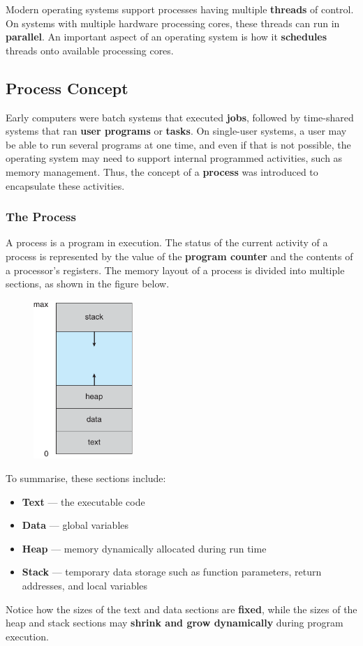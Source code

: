 \documentclass{article}
\begin{document}
Modern operating systems support processes having multiple
\textbf{threads} of control. On systems with multiple hardware
processing cores, these threads can run in \textbf{parallel}. An
important aspect of an operating system is how it \textbf{schedules}
threads onto available processing cores.
\subsection{Process Concept}
Early computers were batch systems that executed \textbf{jobs},
followed by time-shared systems that ran \textbf{user programs} or
\textbf{tasks}. On single-user systems, a user may be able to run
several programs at one time, and even if that is not possible, the
operating system may need to support internal programmed activities,
such as memory management. Thus, the concept of a \textbf{process} was
introduced to encapsulate these activities.
\subsubsection{The Process}
A process is a program in execution. The status of the current activity
of a process is represented by the value of the \textbf{program
counter} and the contents of a processor's registers. The memory layout
of a process is divided into multiple sections, as shown in the figure
below.
\begin{figure}[H]
    \centering
    \includegraphics[height = 6cm]{figures/process_memory_layout.pdf}
\end{figure}
To summarise, these sections include:
\begin{itemize}
    \item \textbf{Text} --- the executable code
    \item \textbf{Data} --- global variables
    \item \textbf{Heap} --- memory dynamically allocated during run time
    \item \textbf{Stack} --- temporary data storage such as function
          parameters, return addresses, and local variables
\end{itemize}
Notice how the sizes of the text and data sections are
\textbf{fixed}, while the sizes of the heap and stack sections may
\textbf{shrink and grow dynamically} during program execution.
\end{document}
